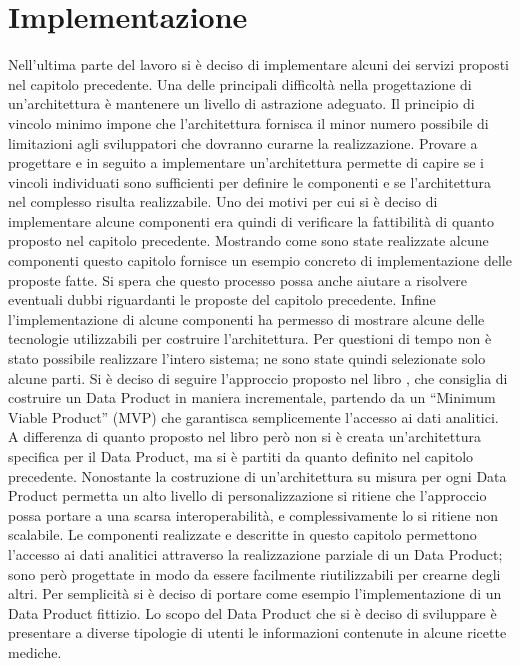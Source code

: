 \documentclass[12pt]{report}
\begin{document}
\chapter{Implementazione}\label{implementazione}
Nell'ultima parte del lavoro si è deciso di implementare alcuni dei servizi proposti nel capitolo precedente.
Una delle principali difficoltà nella progettazione di un'architettura è mantenere un livello di astrazione adeguato.
Il principio di vincolo minimo impone che l'architettura fornisca il minor numero possibile di limitazioni agli sviluppatori che dovranno curarne la realizzazione.
Provare a progettare e in seguito a implementare un'architettura permette di capire se i vincoli individuati sono sufficienti per definire le componenti e se l'architettura nel complesso risulta realizzabile.
Uno dei motivi per cui si è deciso di implementare alcune componenti era quindi di verificare la fattibilità di quanto proposto nel capitolo precedente.
Mostrando come sono state realizzate alcune componenti questo capitolo fornisce un esempio concreto di implementazione delle proposte fatte.
Si spera che questo processo possa anche aiutare a risolvere eventuali dubbi riguardanti le proposte del capitolo precedente.
Infine l'implementazione di alcune componenti ha permesso di mostrare alcune delle tecnologie utilizzabili per costruire l'architettura. 
Per questioni di tempo non è stato possibile realizzare l'intero sistema; ne sono state quindi selezionate solo alcune parti.
Si è deciso di seguire l'approccio proposto nel libro \cite{majchrzak2023data}, che consiglia di costruire un Data Product in maniera incrementale, partendo da un ``Minimum Viable Product'' (MVP) che garantisca semplicemente l'accesso ai dati analitici.
A differenza di quanto proposto nel libro però non si è creata un'architettura specifica per il Data Product, ma si è partiti da quanto definito nel capitolo precedente.
Nonostante la costruzione di un'architettura su misura per ogni Data Product permetta un alto livello di personalizzazione si ritiene che l'approccio possa portare a una scarsa interoperabilità, e complessivamente lo si ritiene non scalabile.
Le componenti realizzate e descritte in questo capitolo permettono l'accesso ai dati analitici attraverso la realizzazione parziale di un Data Product; sono però progettate in modo da essere facilmente riutilizzabili per crearne degli altri. 
Per semplicità si è deciso di portare come esempio l'implementazione di un Data Product fittizio.
Lo scopo del Data Product che si è deciso di sviluppare è presentare a diverse tipologie di utenti le informazioni contenute in alcune ricette mediche.
\end{document}
